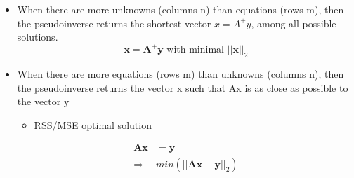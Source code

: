 \documentclass[../Main.tex]{subfiles}
\begin{document}
{    \begin{itemize}
        \item When there are more unknowns 
        (columns n) than equations (rows 
        m), then the pseudoinverse 
        returns the shortest vector 
        \(x=A^+y\), among all possible 
        solutions.
        \begin{equation*}
            \boldsymbol{x} = \boldsymbol{A}^+\boldsymbol{y} \text{ with minimal } ||\boldsymbol{x}||_2
        \end{equation*}
        \item When there are more equations 
        (rows m) than unknowns 
        (columns n), then the 
        pseudoinverse returns the vector 
        x such that Ax is as close as 
        possible to the vector y
        \begin{itemize}
            \item RSS/MSE optimal solution
        \end{itemize}
        \begin{equation*}
            \begin{split}
                \boldsymbol{Ax} &= \boldsymbol{y} \\
                \Rightarrow &min(||\boldsymbol{Ax} - \boldsymbol{y}||_2)
            \end{split}
        \end{equation*}
    \end{itemize}
}
\end{document}
